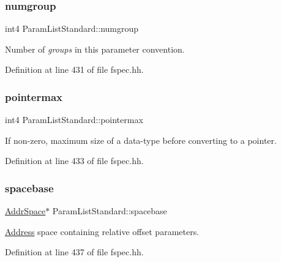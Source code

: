 \subsubsection{\texorpdfstring{numgroup}{numgroup}}
{\footnotesize\ttfamily int4 Param\+List\+Standard\+::numgroup\hspace{0.3cm}{\ttfamily [protected]}}



Number of {\itshape groups} in this parameter convention. 



Definition at line 431 of file fspec.\+hh.

\mbox{\label{class_param_list_standard_aef1c07a708c2278a4a51705a4601035c}} 
\subsubsection{\texorpdfstring{pointermax}{pointermax}}
{\footnotesize\ttfamily int4 Param\+List\+Standard\+::pointermax\hspace{0.3cm}{\ttfamily [protected]}}



If non-\/zero, maximum size of a data-\/type before converting to a pointer. 



Definition at line 433 of file fspec.\+hh.

\mbox{\label{class_param_list_standard_a23eb96cd5ffb8cc27ffb71caed2d96ca}} 
\subsubsection{\texorpdfstring{spacebase}{spacebase}}
{\footnotesize\ttfamily \mbox{\hyperlink{class_addr_space}{Addr\+Space}}$\ast$ Param\+List\+Standard\+::spacebase\hspace{0.3cm}{\ttfamily [protected]}}



\mbox{\hyperlink{class_address}{Address}} space containing relative offset parameters. 



Definition at line 437 of file fspec.\+hh.

